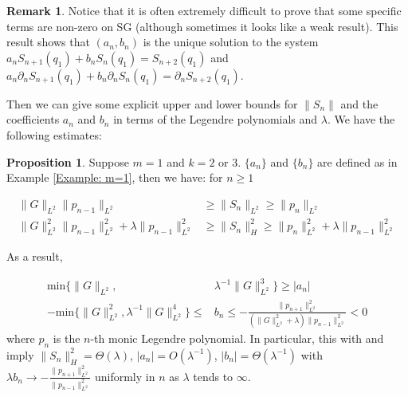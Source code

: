 \documentclass[12pt]{amsart}
\makeatletter
\renewcommand*{\eqref}[1]{%
  \hyperref[{#1}]{\textup{\tagform@{\ref*{#1}}}}%
}
\theoremstyle{plain}
\theoremstyle{definition}
\newtheorem{proposition}{Proposition}[section]
\newtheorem{remark}{Remark}[section]
\newcommand{\mini}[2]{\text{min}\{#1,#2\}}
\makeatother
\begin{document}
\begin{remark}
Notice that it is often extremely difficult to prove that some specific terms are non-zero on SG (although sometimes it looks like a weak result). This result shows that $(a_n, b_n)$ is the unique solution to the system $a_n S_{n+1}(q_1)+b_nS_n(q_1)=S_{n+2}(q_1)$ and $a_n \partial_n S_{n+1}(q_1)+b_n\partial_n S_n(q_1)=\partial_n S_{n+2}(q_1)$.
\end{remark}
Then we can give some explicit upper and lower bounds for $\|S_{n}\|$ and the coefficients $a_n$ and $b_n$ in terms of the Legendre polynomials
and $\lambda$. We have the following estimates:
\begin{proposition}\label{Proposition: L2, H1, coefficients estimates}
Suppose $m=1$ and $k=2$ or $3$. $\{a_n\}$ and $\{b_n\}$ are defined as in Example \ref{Example: m=1}, then we have: for $n\ge 1$
  
   \begin{align}\|G\|_{L^2}\|p_{n-1}\|_{L^2}&\ge\|S_{n}\|_{L^2}\ge \|p_n\|_{L^2} \label{SobolevL2Estimate}\\
   \|G\|_{L^2}^2\|p_{n-1}\|_{L^2}^2+\lambda\|p_{n-1}\|_{L^2}^2&\ge \|S_n\|_{H}^2\ge \|p_n\|_{L^2}^2+
   \lambda \|p_{n-1}\|_{L^2}^2 \label{SobolevH1Estimate} \end{align}
   
   As a result,
   
   \begin{align} 
   \mini{\|G\|_{L^2}}{&\lambda^{-1}\|G\|_{L^2}^3}\ge |a_n| \label{anbounds}\\
    -\mini{\|G\|_{L^2}^2}{\lambda^{-1}\|G\|_{L^2}^4}\le& b_n\le
    -\frac{\|p_{n+1}\|_{L^2}^2}{(\|G\|_{L^2}^2+\lambda)\|p_{n-1}\|_{L^2}^2}< 0 \label{bnbounds}
\end{align}
where $p_{n}$ is the $n$-th monic Legendre polynomial. In particular, this with \eqref{SobolevL2Estimate} and \eqref{SobolevH1Estimate} imply $\|S_n\|_{H}^2=\Theta (\lambda)$, $|a_n|=O(\lambda^{-1})$, $|b_n|=\Theta(\lambda^{-1})$ with $\lambda b_n\rightarrow -\frac{\|p_{n+1}\|_{L^2}^2}{\|p_{n-1}\|_{L^2}^2}$ uniformly in $n$ as $\lambda$ tends to $\infty$.
\end{proposition} 
\end{document}
